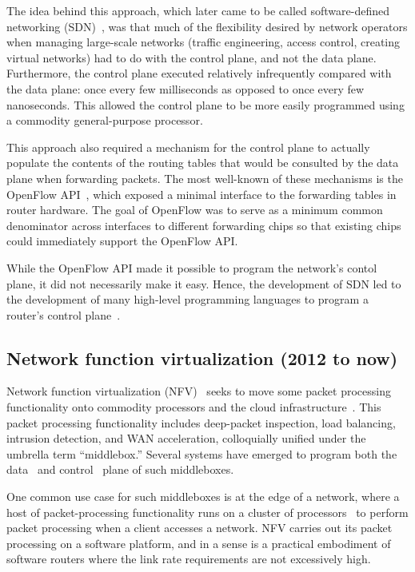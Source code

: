 The idea behind this approach, which later came to be called software-defined
networking (SDN)~\cite{sdn_coining}, was that much of the flexibility desired by
network operators when managing large-scale networks (\eg traffic engineering,
access control, creating virtual networks) had to do with the control plane,
and not the data plane.  Furthermore, the control plane executed relatively
infrequently compared with the data plane: once every few milliseconds as
opposed to once every few nanoseconds. This allowed the control plane to be
more easily programmed using a commodity general-purpose processor.

This approach also required a mechanism for the control plane to actually
populate the contents of the routing tables that would be consulted by the data
plane when forwarding packets. The most well-known of these mechanisms is the
OpenFlow API~\cite{openflow}, which exposed a minimal interface to the
forwarding tables in router hardware. The goal of OpenFlow was to serve as a
minimum common denominator across interfaces to different forwarding chips so
that existing chips could immediately support the OpenFlow API.

While the OpenFlow API made it possible to program the network's contol plane,
it did not necessarily make it easy. Hence, the development of SDN led to the
development of many high-level programming languages to program a router's
control plane~\cite{frenetic, pyretic}.

\subsection{Network function virtualization (2012 to now)}

Network function virtualization (NFV)~\cite{nfv_etsi_2012} seeks to move some
packet processing functionality onto commodity processors and the cloud
infrastructure~\cite{aplomb}. This packet processing functionality includes
deep-packet inspection, load balancing, intrusion detection, and WAN
acceleration, colloquially unified under the umbrella term ``middlebox.''
Several systems have emerged to program both the data~\cite{netbricks} and
control~\cite{opennf} plane of such middleboxes.

One common use case for such middleboxes is at the edge of a network, where a
host of packet-processing functionality runs on a cluster of
processors~\cite{e2} to perform packet processing when a client accesses a
network. NFV carries out its packet processing on a software platform, and in a
sense is a practical embodiment of software routers where the link rate
requirements are not excessively high.

